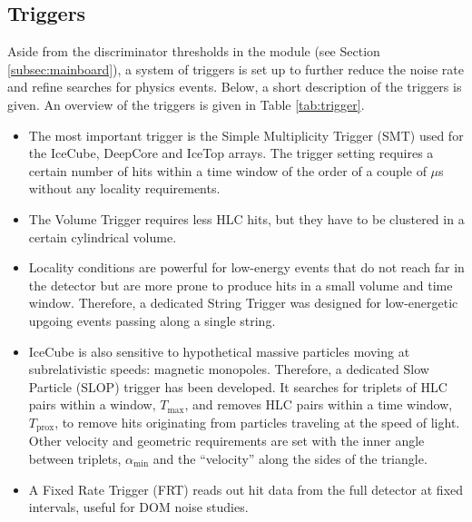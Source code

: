 \subsection{Triggers}
\label{subsec:triggers}
Aside from the discriminator thresholds in the module (see Section \ref{subsec:mainboard}), a system of triggers is set up to further reduce the noise rate and refine searches for physics events. Below, a short description of the triggers is given. An overview of the triggers is given in Table \ref{tab:trigger}. 

\vspace{2mm}
\begin{itemize}
\item The most important trigger is the Simple Multiplicity Trigger (SMT) used for the IceCube, DeepCore and IceTop arrays. The trigger setting requires a certain number of hits within a time window of the order of a couple of $\mu$s without any locality requirements.
\item The Volume Trigger requires less HLC hits, but they have to be clustered in a certain cylindrical volume. 
\item Locality conditions are powerful for low-energy events that do not reach far in the detector but are more prone to produce hits in a small volume and time window. Therefore, a dedicated String Trigger was designed for low-energetic upgoing events passing along a single string. 
\item IceCube is also sensitive to hypothetical massive particles moving at subrelativistic speeds: magnetic monopoles. Therefore, a dedicated Slow Particle (SLOP) trigger has been developed. It searches for triplets of HLC pairs within a window, $T_{\textrm{max}}$, and removes HLC pairs within a time window, $T_{\textrm{prox}}$, to remove hits originating from particles traveling at the speed of light. Other velocity and geometric requirements are set with the inner angle between triplets, $\alpha_{\textrm{min}}$ and the ``velocity'' along the sides of the triangle.
\item A Fixed Rate Trigger (FRT) reads out hit data from the full detector at fixed intervals, useful for DOM noise studies.
\end{itemize}
\vspace{2mm}

